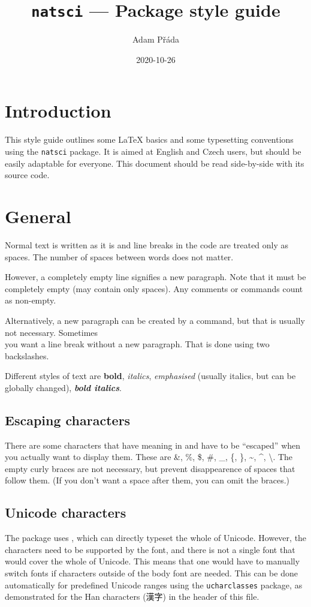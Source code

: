 \documentclass{article}
\title{\vspace{-2cm}\texttt{natsci} --- Package style guide}
\author{Adam Přáda}
\date{2020-10-26}
\begin{document}
\pagestyle{fancy}
\maketitle
\section{Introduction}
This style guide outlines some \LaTeX{} basics and some typesetting conventions using the \texttt{natsci} package. It is aimed at English and Czech users, but should be easily adaptable for everyone. This document should be read side-by-side with its source code.
\section{General}
Normal text is written as it is
and line breaks
in
the
code
are treated only as spaces. The number of spaces                            between words does not matter.

However, a completely empty line signifies a new paragraph. Note that it must be completely empty (may contain only spaces). Any comments or commands count as non-empty. \par Alternatively, a new paragraph can be created by a command, but that is usually not necessary. Sometimes\\ you want a line break without a new paragraph. That is done using two backslashes.

Different styles of text are \textbf{bold}, \textit{italics}, \emph{emphasised} (usually italics, but can be globally changed), \textbf{\textit{bold italics}}.

\subsection{Escaping characters}
There are some characters that have meaning in  and have to be ``escaped'' when you actually want to display them. These are \&, \%, \$, \#, \_, \{, \}, \textasciitilde{}, \textasciicircum{}, \textbackslash{}. The empty curly braces are not necessary, but prevent disappearence of spaces that follow them. (If you don't want a space after them, you can omit the braces.)

\subsection{Unicode characters}
The package uses , which can directly typeset the whole of Unicode. However, the characters need to be supported by the font, and there is not a single font that would cover the whole of Unicode. This means that one would have to manually switch fonts if characters outside of the body font are needed. This can be done automatically for predefined Unicode ranges using the \texttt{ucharclasses} package, as demonstrated for the Han characters (漢字) in the header of this file.
\newpage
\end{document}
